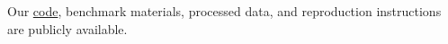 Our \href{https://anonymous.4open.science/r/RetailBench_ARR-6253}{code}, benchmark materials, processed data, and reproduction instructions are publicly available.
